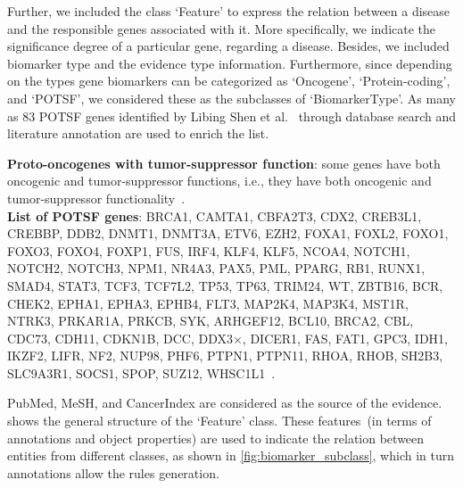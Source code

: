 \hspace*{3.5mm} Further, we included the class `Feature' to express the relation between a disease and the responsible genes associated with it. More specifically, we indicate the significance degree of a particular gene, regarding a disease. Besides, we included biomarker type and the evidence type information. Furthermore, since depending on the types gene biomarkers can be categorized as `Oncogene', `Protein-coding', and `POTSF', we considered these as the subclasses of `BiomarkerType'. As many as 83 POTSF genes identified by Libing Shen et al.~\cite{POSTF} through database search and literature annotation are used to enrich the list. \\

\vspace{-2mm}
\begin{tcolorbox}[colback=white!3!white,colframe=gray!120!black,title=\faBook~Proto-oncogenes with tumor-suppressor function~(POTSF):]
    \scriptsize{
        \textbf{Proto-oncogenes with tumor-suppressor function}: some genes have both oncogenic and tumor-suppressor functions, i.e., they have both oncogenic and tumor-suppressor functionality~\cite{POSTF}.\\
        \textbf{List of POTSF genes}: BRCA1, CAMTA1, CBFA2T3, CDX2, CREB3L1, CREBBP, DDB2, DNMT1, DNMT3A, ETV6, EZH2, FOXA1, FOXL2, FOXO1, FOXO3, FOXO4, FOXP1, FUS, IRF4, KLF4, KLF5, NCOA4, NOTCH1, NOTCH2, NOTCH3, NPM1, NR4A3, PAX5, PML, PPARG, RB1, RUNX1, SMAD4, STAT3, TCF3, TCF7L2, TP53, TP63, TRIM24, WT, ZBTB16, BCR, CHEK2, EPHA1, EPHA3, EPHB4, FLT3, MAP2K4, MAP3K4, MST1R, NTRK3, PRKAR1A, PRKCB, SYK, ARHGEF12, BCL10, BRCA2, CBL, CDC73, CDH11, CDKN1B, DCC, DDX3×, DICER1, FAS, FAT1, GPC3, IDH1, IKZF2, LIFR, NF2, NUP98, PHF6, PTPN1, PTPN11, RHOA, RHOB, SH2B3, SLC9A3R1, SOCS1, SPOP, SUZ12, WHSC1L1~\cite{POSTF}. 
        }
\end{tcolorbox}

\hspace*{3.5mm} PubMed, MeSH, and CancerIndex are considered as the source of the evidence.  shows the general structure of the `Feature' class. These features~(in terms of annotations and object properties) are used to indicate the relation between entities from different classes, as shown in \cref{fig:biomarker_subclass}, which in turn annotations allow the rules generation. 


